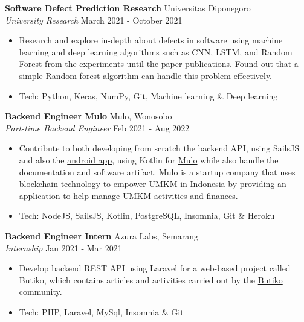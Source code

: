 \documentclass[a4paper]{article}
\begin{document}
\textbf{Software Defect Prediction Research} \hfill Universitas Diponegoro\\
\textit{University Research} \hfill March 2021 - October 2021\\
\vspace{-1mm}
\begin{itemize} \itemsep 1pt
	\item Research and explore in-depth about defects in software using machine learning and deep learning algorithms such as CNN, LSTM, and Random Forest from the experiments until the
	\href{https://github.com/mhnaufal/Software-Defect-Finale/blob/main/reports/PAPER-Software%20Defect%20Prediction.pdf}{paper publications}. Found out that a simple Random forest algorithm can handle this problem effectively.
	\item Tech: Python, Keras, NumPy, Git, Machine learning \& Deep learning
\end{itemize}

\textbf{Backend Engineer Mulo} \hfill Mulo, Wonosobo\\
\textit{Part-time Backend Engineer} \hfill Feb 2021 - Aug 2022\\
\vspace{-1mm}
\begin{itemize} \itemsep 1pt
	\item Contribute to both developing from scratch the backend API, using SailsJS and also the \href{https://play.google.com/store/apps/details?id=app.mulo}{android app}, using Kotlin for \href{https://muloapp.id/}{Mulo} while also handle the documentation and software artifact. Mulo is a startup company that uses blockchain technology to empower UMKM in Indonesia by providing an application to help manage UMKM activities and finances.
	\item Tech: NodeJS, SailsJS, Kotlin, PostgreSQL, Insomnia, Git \& Heroku
\end{itemize}

\textbf{Backend Engineer Intern} \hfill Azura Labs, Semarang\\
\textit{Internship} \hfill Jan 2021 - Mar 2021\\
\vspace{-1mm}
\begin{itemize} \itemsep 1pt
	\item Develop backend REST API using Laravel for a web-based project called \textquotesingle{}Butiko\textquotesingle{}, which contains articles and activities carried out by the \textquotesingle{}\href{https://butiko.id/}{Butiko}\textquotesingle{} community.
	\item Tech: PHP, Laravel, MySql, Insomnia \& Git
\end{itemize}
\end{document}
